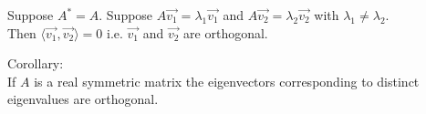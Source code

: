 \documentclass{report}
\begin{document}
   {
   Suppose $ A ^{*} = A$. Suppose $ A \vec{ v_1} = \lambda_1 \vec{ v_1} $ and $ A \vec{ v_2} = \lambda_2 \vec{ v_2} $ with $  \lambda_1 \neq \lambda_2$.\\
   Then $ \langle \vec{ v_1} , \vec{ v_2}   \rangle = 0$ i.e.  $ \vec{ v_1}$ and $ \vec{ v_2}$ are orthogonal.\\
   }

   Corollary: \\
   If $ A$ is a real symmetric matrix the eigenvectors corresponding to distinct eigenvalues are orthogonal.\\
\end{document}
